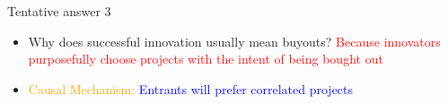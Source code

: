 \documentclass{beamer}
\numberwithin{equation}{section}
\begin{document}
\begin{frame}{Tentative answer 3}
\begin{itemize}
    \item Why does successful innovation usually mean buyouts? \textcolor{red}{Because innovators purposefully choose projects with the intent of being bought out}
    \item \textcolor{orange}{Causal Mechanism:} \textcolor{blue}{Entrants will prefer correlated projects}
\end{itemize}
\end{frame}


\end{document}
